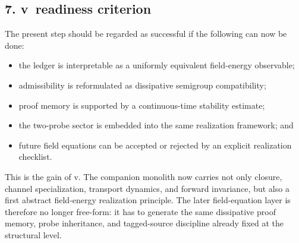 \subsection*{7. v\docversion\ readiness criterion}
The present step should be regarded as successful if the following can now be done:
\begin{itemize}
  \item the ledger is interpretable as a uniformly equivalent field-energy observable;
  \item admissibility is reformulated as dissipative semigroup compatibility;
  \item proof memory is supported by a continuous-time stability estimate;
  \item the two-probe sector is embedded into the same realization framework; and
  \item future field equations can be accepted or rejected by an explicit realization checklist.
\end{itemize}

This is the gain of v\docversion. The companion monolith now carries not only
closure, channel specialization, transport dynamics, and forward invariance, but also
a first abstract field-energy realization principle. The later field-equation layer is
therefore no longer free-form: it has to generate the same dissipative proof memory,
probe inheritance, and tagged-source discipline already fixed at the structural level.


